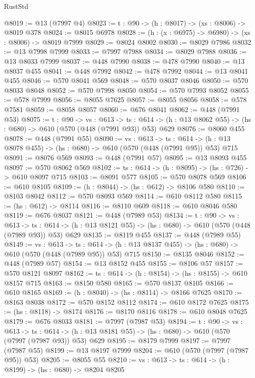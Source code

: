 \begin{lexlean}{RustStd}
\begin{coremodule}
@8019 := @13 (@7997 @4)
@8023 := {t : @90} -> (h : @8017) -> (xs : @8006) -> @8019 @378
@8024 := @8015 @6978
@8028 := (h : (x : @6975) -> @6980) -> (xs : @8006) -> @8019 @7999
@8029 := @8024 @8002
@8030 := @8029 @7986
@8032 := @13 @7998 @7999
@8033 := @7997 @7988
@8034 := @8029 @7988
@8036 := @13 @8033 @7999
@8037 := @448 @7990
@8038 := @478 @7990
@8040 := @13 @8037 @455
@8041 := @448 @7992
@8042 := @478 @7992
@8044 := @13 @8041 @455
@8046 := @570 @8041 @569
@8048 := @570 @8037 @8046
@8050 := @570 @8033 @8048
@8052 := @570 @7998 @8050
@8054 := @570 @7993 @8052
@8055 := @578 @7999
@8056 := @8055 @7625
@8057 := @8055 @8056
@8058 := @578 @7581
@8059 := @8058 @8057
@8060 := @676 @8041
@8062 := @448 (@7991 @53)
@8075 := {t : @90} ->
  {vs : @613} ->
  {ts : @614} -> (h : @13 @8062 @55) -> (hs : @680) -> @610 (@570 (@448 (@7991 @93)) @53) @629
@8076 := @8060 @455
@8078 := @448 (@7991 @55)
@8090 := {vs : @613} ->
  {ts : @614} -> (h : @13 @8078 @455) -> (hs : @680) -> @610 (@570 (@448 (@7991 @95)) @53) @715
@8091 := @8076 @569
@8093 := @448 (@7991 @57)
@8095 := @13 @8093 @455
@8097 := @570 @8062 @569
@8102 := {ts : @614} -> (h : @8095) -> (hs : @726) -> @610 @8097 @715
@8103 := @8091 @577
@8105 := @570 @8078 @569
@8106 := @610 @8105
@8109 := (h : @8044) -> (hs : @612) -> @8106 @580
@8110 := @8103 @8042
@8112 := @570 @8093 @569
@8114 := @610 @8112 @580
@8115 := (hs : @612) -> @8114
@8116 := @8110 @609
@8118 := @610 @8046 @580
@8119 := @676 @8037
@8121 := @448 (@7989 @53)
@8134 := {t : @90} ->
  {vs : @613} ->
  {ts : @614} -> (h : @13 @8121 @55) -> (hs : @680) -> @610 (@570 (@448 (@7989 @93)) @53) @629
@8135 := @8119 @455
@8137 := @448 (@7989 @55)
@8149 := {vs : @613} ->
  {ts : @614} -> (h : @13 @8137 @455) -> (hs : @680) -> @610 (@570 (@448 (@7989 @95)) @53) @715
@8150 := @8135 @8046
@8152 := @448 (@7989 @57)
@8154 := @13 @8152 @455
@8155 := @8106 @57
@8157 := @570 @8121 @8097
@8162 := {ts : @614} -> (h : @8154) -> (hs : @8155) -> @610 @8157 @715
@8163 := @8150 @580
@8165 := @570 @8137 @8105
@8166 := @610 @8165
@8169 := (h : @8040) -> (hs : @8114) -> @8166 @7625
@8170 := @8163 @8038
@8172 := @570 @8152 @8112
@8174 := @610 @8172 @7625
@8175 := (hs : @8118) -> @8174
@8176 := @8170 @8116
@8178 := @610 @8048 @7625
@8179 := @676 @8033
@8181 := @7997 (@7987 @53)
@8194 := {t : @90} ->
  {vs : @613} ->
  {ts : @614} -> (h : @13 @8181 @55) -> (hs : @680) -> @610 (@570 (@7997 (@7987 @93)) @53) @629
@8195 := @8179 @7999
@8197 := @7997 (@7987 @55)
@8199 := @13 @8197 @7999
@8204 := @610 (@570 (@7997 (@7987 @95)) @53)
@8205 := @8055 @55
@8210 := {vs : @613} -> {ts : @614} -> (h : @8199) -> (hs : @680) -> @8204 @8205

\end{coremodule}
\end{lexlean}
